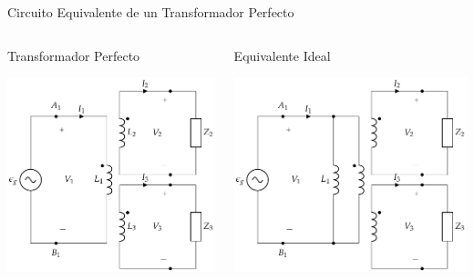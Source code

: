 \documentclass[xcolor={usenames,svgnames,dvipsnames}]{beamer}
\begin{document}
\begin{frame}[label={sec:orgd00c043}]{Circuito Equivalente de un Transformador Perfecto}
\begin{columns}
\begin{column}{0.5\columnwidth}
Transformador Perfecto
\begin{center}
\includegraphics[width=\textwidth]{../figs/TrafoPerfectoVariosDevanados_Impedancia.pdf}
\end{center}
\end{column}
\begin{column}{0.5\columnwidth}
Equivalente Ideal
\begin{center}
\includegraphics[width=\textwidth]{../figs/TrafoPerfectoIdealVariosDevanados_Impedancia.pdf}
\end{center}
\end{column}
\end{columns}
\end{frame}
\end{document}
